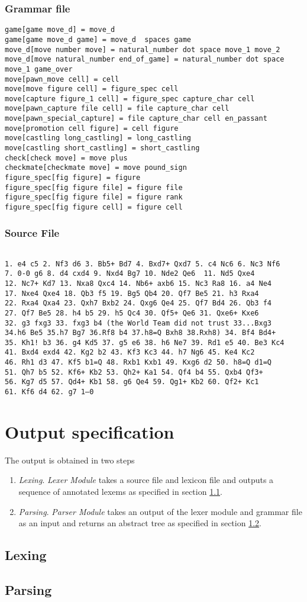 \documentclass[a4paper,10pt]{article}
\begin{document}
\subsubsection{Grammar file}
\begin{verbatim}
game[game move_d] = move_d 
game[game move_d game] = move_d  spaces game
move_d[move number move] = natural_number dot space move_1 move_2
move_d[move natural_number end_of_game] = natural_number dot space move_1 game_over
move[pawn_move cell] = cell
move[move figure cell] = figure_spec cell
move[capture figure_1 cell] = figure_spec capture_char cell
move[pawn_capture file cell] = file capture_char cell
move[pawn_special_capture] = file capture_char cell en_passant
move[promotion cell figure] = cell figure
move[castling long_castling] = long_castling
move[castling short_castling] = short_castling
check[check move] = move plus
checkmate[checkmate move] = move pound_sign
figure_spec[fig figure] = figure
figure_spec[fig figure file] = figure file
figure_spec[fig figure file] = figure rank
figure_spec[fig figure cell] = figure cell
\end{verbatim}

\subsubsection{Source File}

\begin{verbatim}

1. e4 c5 2. Nf3 d6 3. Bb5+ Bd7 4. Bxd7+ Qxd7 5. c4 Nc6 6. Nc3 Nf6 
7. 0-0 g6 8. d4 cxd4 9. Nxd4 Bg7 10. Nde2 Qe6  11. Nd5 Qxe4 
12. Nc7+ Kd7 13. Nxa8 Qxc4 14. Nb6+ axb6 15. Nc3 Ra8 16. a4 Ne4 
17. Nxe4 Qxe4 18. Qb3 f5 19. Bg5 Qb4 20. Qf7 Be5 21. h3 Rxa4 
22. Rxa4 Qxa4 23. Qxh7 Bxb2 24. Qxg6 Qe4 25. Qf7 Bd4 26. Qb3 f4 
27. Qf7 Be5 28. h4 b5 29. h5 Qc4 30. Qf5+ Qe6 31. Qxe6+ Kxe6 
32. g3 fxg3 33. fxg3 b4 (the World Team did not trust 33...Bxg3 
34.h6 Be5 35.h7 Bg7 36.Rf8 b4 37.h8=Q Bxh8 38.Rxh8) 34. Bf4 Bd4+ 
35. Kh1! b3 36. g4 Kd5 37. g5 e6 38. h6 Ne7 39. Rd1 e5 40. Be3 Kc4 
41. Bxd4 exd4 42. Kg2 b2 43. Kf3 Kc3 44. h7 Ng6 45. Ke4 Kc2 
46. Rh1 d3 47. Kf5 b1=Q 48. Rxb1 Kxb1 49. Kxg6 d2 50. h8=Q d1=Q 
51. Qh7 b5 52. Kf6+ Kb2 53. Qh2+ Ka1 54. Qf4 b4 55. Qxb4 Qf3+ 
56. Kg7 d5 57. Qd4+ Kb1 58. g6 Qe4 59. Qg1+ Kb2 60. Qf2+ Kc1 
61. Kf6 d4 62. g7 1–0 
\end{verbatim}

\section{Output specification}
The output is obtained in two steps
\begin{enumerate}
\item \textit{Lexing}.  \textit{Lexer Module} takes a source file and lexicon file and outputs a sequence of annotated lexems as specified in section \ref{lex}.
\item \textit{Parsing}. \textit{Parser Module} takes an output of the lexer module and grammar file as an input and returns an abstract tree as specified in section \ref{pars}.
\end{enumerate}

\subsection{Lexing}\label{lex}
\subsection{Parsing}\label{pars}


\end{document}
